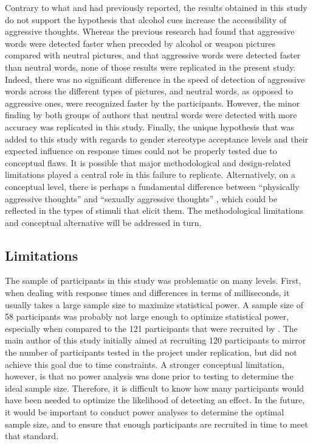\documentclass[serif, authorddate, twocolumn, empirical]{jote-article}
\begin{document}
Contrary to what \textcite{BartholowHeinz2006} and \textcite{SubraMullerBegueLBushmanDelmas2010} had previously reported, the results obtained in this study do not support the hypothesis that alcohol cues increase the accessibility of aggressive thoughts. Whereas the previous research had found that aggressive words were detected faster when preceded by alcohol or weapon pictures compared with neutral pictures, and that aggressive words were detected faster than neutral words, none of those results were replicated in the present study. Indeed, there was no significant difference in the speed of detection of aggressive words across the different types of pictures, and neutral words, as opposed to aggressive ones, were recognized faster by the participants. However, the minor finding by both groups of authors that neutral words were detected with more accuracy was replicated in this study. Finally, the unique hypothesis that was added to this study with regards to gender stereotype acceptance levels and their expected influence on response times could not be properly tested due to conceptual flaws. It is possible that major methodological and design-related limitations played a central role in this failure to replicate. Alternatively, on a conceptual level, there is perhaps a fundamental difference between ``physically aggressive thoughts”  and ``sexually aggressive thoughts” , which could be reflected in the types of stimuli that elicit them. The methodological limitations and conceptual alternative will be addressed in turn. 

{}
\subsection*{Limitations}
The sample of participants in this study was problematic on many levels. First, when dealing with response times and differences in terms of milliseconds, it usually takes a large sample size to maximize statistical power. A sample size of 58 participants was probably not large enough to optimize statistical power, especially when compared to the 121 participants that were recruited by \textcite{BartholowHeinz2006}. The main author of this study initially aimed at recruiting 120 participants to mirror the number of participants tested in the project under replication, but did not achieve this goal due to time constraints. A stronger conceptual limitation, however, is that no power analysis was done prior to testing to determine the ideal sample size. Therefore, it is difficult to know how many participants would have been needed to optimize the likelihood of detecting an effect. In the future, it would be important to conduct power analyses to determine the optimal sample size, and to ensure that enough participants are recruited in time to meet that standard. 
\end{document}

